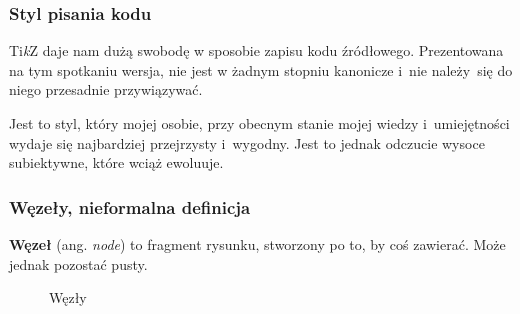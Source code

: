 \documentclass[10pt,t]{beamer}  %
\begin{document}
\begin{frame}
  \frametitle{Styl pisania kodu}


  Ti\emph{k}Z daje nam dużą swobodę w sposobie zapisu kodu źródłowego.
  Prezentowana na tym spotkaniu wersja, nie jest w żadnym stopniu
  kanonicze i~nie należy~się do niego przesadnie przywiązywać.

  Jest to styl, który mojej osobie, przy obecnym stanie mojej wiedzy
  i~umiejętności wydaje się najbardziej przejrzysty i~wygodny. Jest to
  jednak odczucie wysoce subiektywne, które wciąż ewoluuje.

\end{frame}





\begin{frame}
  \frametitle{Węzeły, nieformalna definicja}


  \textbf{Węzeł} (ang. \emph{node}) to fragment rysunku, stworzony po
  to, by coś zawierać. Może jednak pozostać pusty.

  \begin{figure}

    \centering


    \caption{Węzły}

  \end{figure}

\end{frame}
\end{document}
